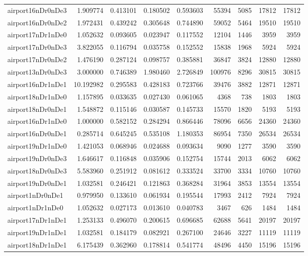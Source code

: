 \begin{longtable}{|l|r|r|r|r|r|r|r|r|}
airport16nDr0nDe3 & 1.909774 & 0.413101 & 0.180502 & 0.593603 & 55394 & 5085 & 17812 & 17812 \\
airport16nDr0nDe2 & 1.972431 & 0.439242 & 0.305648 & 0.744890 & 59052 & 5464 & 19510 & 19510 \\
airport17nDr1nDe0 & 1.052632 & 0.093605 & 0.023947 & 0.117552 & 12104 & 1446 & 3959 & 3959 \\
airport17nDr0nDe3 & 3.822055 & 0.116794 & 0.035758 & 0.152552 & 15838 & 1968 & 5924 & 5924 \\
airport17nDr0nDe2 & 1.476190 & 0.287124 & 0.098757 & 0.385881 & 36847 & 3824 & 12880 & 12880 \\
airport13nDr0nDe3 & 3.000000 & 0.746389 & 1.980460 & 2.726849 & 100976 & 8296 & 30815 & 30815 \\
airport16nDr1nDe1 & 10.192982 & 0.295583 & 0.428183 & 0.723766 & 39476 & 3882 & 12871 & 12871 \\
airport18nDr1nDe0 & 1.157895 & 0.033635 & 0.027430 & 0.061065 & 4368 & 738 & 1803 & 1803 \\
airport18nDr0nDe1 & 1.548872 & 0.115146 & 0.030587 & 0.145733 & 15570 & 1820 & 5193 & 5193 \\
airport16nDr1nDe0 & 1.000000 & 0.582152 & 0.284294 & 0.866446 & 78096 & 6656 & 24360 & 24360 \\
airport16nDr0nDe1 & 0.285714 & 0.645245 & 0.535108 & 1.180353 & 86954 & 7350 & 26534 & 26534 \\
airport19nDr1nDe0 & 1.421053 & 0.068946 & 0.024688 & 0.093634 & 9090 & 1277 & 3590 & 3590 \\
airport19nDr0nDe3 & 1.646617 & 0.116848 & 0.035906 & 0.152754 & 15744 & 2013 & 6062 & 6062 \\
airport18nDr0nDe3 & 5.583960 & 0.251912 & 0.081612 & 0.333524 & 33700 & 3334 & 10760 & 10760 \\
airport19nDr0nDe1 & 1.032581 & 0.246421 & 0.121863 & 0.368284 & 31964 & 3853 & 13554 & 13554 \\
airport1nDr0nDe1 & 0.979950 & 0.133610 & 0.061934 & 0.195544 & 17993 & 2412 & 7924 & 7924 \\
airport1nDr1nDe0 & 1.052632 & 0.027173 & 0.013610 & 0.040783 & 3467 & 626 & 1484 & 1484 \\
airport17nDr1nDe1 & 1.253133 & 0.496070 & 0.200615 & 0.696685 & 62688 & 5641 & 20197 & 20197 \\
airport19nDr1nDe1 & 1.032581 & 0.184179 & 0.082921 & 0.267100 & 24646 & 3227 & 11119 & 11119 \\
airport18nDr1nDe1 & 6.175439 & 0.362960 & 0.178814 & 0.541774 & 48496 & 4450 & 15196 & 15196 \\

\end{longtable}
